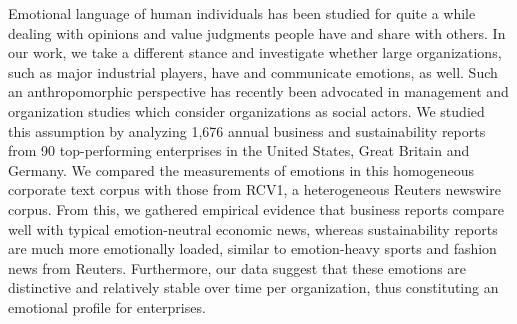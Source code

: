 Emotional language of human individuals has been studied for quite a while dealing with opinions and value judgments people have and share with others. In our work, we take a different stance and investigate whether large organizations, such as major industrial players, have and communicate emotions, as well. Such an anthropomorphic perspective has recently been advocated in management and organization studies which consider organizations as social actors. We studied this assumption by analyzing 1,676 annual business and sustainability reports from 90 top-performing enterprises in the United States, Great Britain and Germany. We compared the measurements of emotions in this homogeneous corporate text corpus with those from RCV1, a heterogeneous Reuters newswire corpus. From this, we gathered empirical evidence that business reports compare well with typical emotion-neutral economic news, whereas sustainability reports are much more emotionally loaded, similar to emotion-heavy sports and fashion news from Reuters. Furthermore, our data suggest that these emotions are distinctive and relatively stable over time per organization, thus constituting an emotional profile for enterprises.
